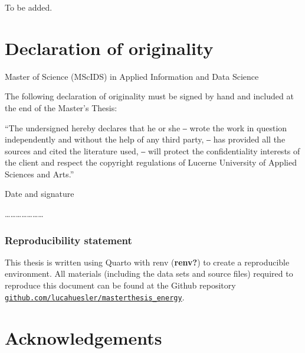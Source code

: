 \documentclass[
  letterpaper,
  DIV=11,
  numbers=noendperiod]{scrreprt}
\begin{document}

To be added.


\hypertarget{declaration-of-originality}{%
\chapter*{Declaration of originality}\label{declaration-of-originality}}


Master of Science (MScIDS) in Applied Information and Data Science

The following declaration of originality must be signed by hand and
included at the end of the Master's Thesis:

``The undersigned hereby declares that he or she ‒ wrote the work in
question independently and without the help of any third party, ‒ has
provided all the sources and cited the literature used, ‒ will protect
the confidentiality interests of the client and respect the copyright
regulations of Lucerne University of Applied Sciences and Arts.''

Date and signature

\ldots\ldots\ldots\ldots\ldots\ldots\ldots{}

\hypertarget{reproducibility-statement}{%
\subsection*{Reproducibility
statement}\label{reproducibility-statement}}

This thesis is written using Quarto with renv (\textbf{renv?}) to create
a reproducible environment. All materials (including the data sets and
source files) required to reproduce this document can be found at the
Github repository
\href{https://github.com/lucahuesler/masterthesis_energy}{\texttt{github.com/lucahuesler/masterthesis\_energy}}.


\hypertarget{acknowledgements}{%
\chapter*{Acknowledgements}\label{acknowledgements}}
\end{document}
